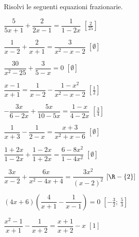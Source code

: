 \begin{esercizio}[*]
\label{ese:20.21}
Risolvi le seguenti equazioni frazionarie.
\begin{htmulticols}{2}
\begin{enumeratea}
 \item \(\dfrac{5}{5x+1}+\dfrac{2}{2x-1}=\dfrac{1}{1-2x}\)
  \hfill \(\left[\frac{2}{25}\right]\)
 \item \(\dfrac{1}{x-2}+\dfrac{2}{x+1}=\dfrac{3}{x^{2}-x-2}\)
  \hfill \(\left[\emptyset\right]\)
 \item \(\dfrac{30}{x^{2}-25}+\dfrac{3}{5-x}=0\)
  \hfill \(\left[\emptyset\right]\)
 \item \(\dfrac{x-1}{x+1}=\dfrac{1}{x-2}-\dfrac{1-x^{2}}{x^{2}-x-2}\)
  \hfill \(\left[\frac{1}{2}\right]\)
 \item \(-{\dfrac{3x}{6-2x}}+\dfrac{5x}{10-5x}=\dfrac{1-x}{4-2x}\)
  \hfill \(\left[\frac{3}{4}\right]\)
 \item \(\dfrac{1}{x+3}-\dfrac{1}{2-x}=\dfrac{x+3}{x^{2}+x-6}\)
  \hfill \(\left[\emptyset\right]\)
 \item \(\dfrac{1+2x}{1-2x}+\dfrac{1-2x}{1+2x}=\dfrac{6-8x^{2}}{1-4x^{2}}\)
  \hfill \(\left[\emptyset\right]\)
 \item \(\dfrac{3x}{x-2}+\dfrac{6x}{x^{2}-4x+4}=\dfrac{3x^{2}}{(x-2)^{2}}\)
  \hfill \(\left[\R-\{2\}\right]\)
 \item \((4x+6)\left(\dfrac{4}{x+1}-\dfrac{1}{x-1}\right)=0\)
  \hfill \(\left[-{\frac{3}{2}};~\frac{5}{3}\right]\)
 \item \(\dfrac{x^{2}-1}{x+1}-\dfrac{1}{x+2}=\dfrac{x+1}{x+2}-x\)
  \hfill \(\left[1\right]\)
\end{enumeratea}
\end{htmulticols}
\end{esercizio}

